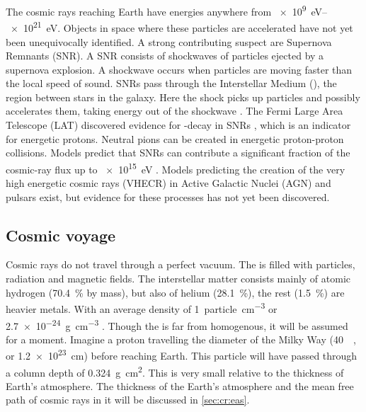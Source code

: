 The cosmic rays reaching Earth have energies anywhere from \SIrange{e9}{e21}{\eV}. Objects in space where these particles are accelerated have not yet been unequivocally identified. A strong contributing suspect are Supernova Remnants (SNR). A SNR consists of shockwaves of particles ejected by a supernova explosion. A shockwave occurs when particles are moving faster than the local speed of sound. SNRs pass through the Interstellar Medium (\ism), the region between stars in the galaxy. Here the shock picks up particles and possibly accelerates them, taking energy out of the shockwave \cite{helder2009snr}. The Fermi Large Area Telescope (LAT) discovered evidence for \Pgpz-decay in SNRs \cite{ackermann2013snr}, which is an indicator for energetic protons. Neutral pions can be created in energetic proton-proton collisions. Models predict that SNRs can contribute a significant fraction of the cosmic-ray flux up to \SI{e15}{\eV} \cite{cardillo2015snr}. Models predicting the creation of the very high energetic cosmic rays (VHECR) in Active Galactic Nuclei (AGN) and pulsars exist, but evidence for these processes has not yet been discovered.


\subsection{Cosmic voyage}

Cosmic rays do not travel through a perfect vacuum. The \ism is filled with particles, radiation and magnetic fields. The interstellar matter consists mainly of atomic hydrogen (\SI{70.4}{\percent} by mass), but also of helium (\SI{28.1}{\percent}), the rest (\SI{1.5}{\percent}) are heavier metals. With an average density of \SI{1}{particle\per\centi\meter\cubed} or \SI{2.7e-24}{\gram\per\centi\meter\cubed} \cite{ferriere2001ism}. Though the \ism is far from homogenous, it will be assumed for a moment. Imagine a proton travelling the diameter of the Milky Way (\SI{40}{\kilo\parsec}, or \SI{1.2e23}{\cm}) before reaching Earth. This particle will have passed through a column depth of \SI{0.324}{\gram\centi\meter\squared}. This is very small relative to the thickness of Earth's atmosphere. The thickness of the Earth's atmosphere and the mean free path of cosmic rays in it will be discussed in \cref{sec:cr:eas}.

